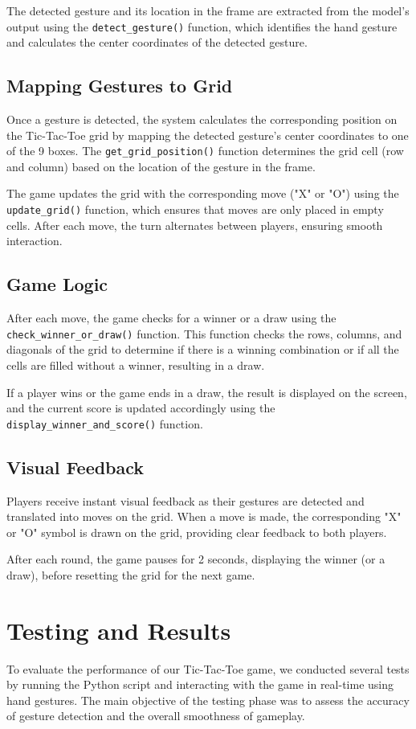 \documentclass[a4paper,12pt]{article}
\begin{document}
The detected gesture and its location in the frame are extracted from the model's output using the \texttt{detect\_gesture()} function, which identifies the hand gesture and calculates the center coordinates of the detected gesture.

\subsection{Mapping Gestures to Grid}
Once a gesture is detected, the system calculates the corresponding position on the Tic-Tac-Toe grid by mapping the detected gesture’s center coordinates to one of the 9 boxes. The \texttt{get\_grid\_position()} function determines the grid cell (row and column) based on the location of the gesture in the frame.

The game updates the grid with the corresponding move ("X" or "O") using the \texttt{update\_grid()} function, which ensures that moves are only placed in empty cells. After each move, the turn alternates between players, ensuring smooth interaction.

\subsection{Game Logic}
After each move, the game checks for a winner or a draw using the \texttt{check\_winner\_or\_draw()} function. This function checks the rows, columns, and diagonals of the grid to determine if there is a winning combination or if all the cells are filled without a winner, resulting in a draw.

If a player wins or the game ends in a draw, the result is displayed on the screen, and the current score is updated accordingly using the \texttt{display\_winner\_and\_score()} function.

\subsection{Visual Feedback}
Players receive instant visual feedback as their gestures are detected and translated into moves on the grid. When a move is made, the corresponding "X" or "O" symbol is drawn on the grid, providing clear feedback to both players.

After each round, the game pauses for 2 seconds, displaying the winner (or a draw), before resetting the grid for the next game.

\section{Testing and Results}
To evaluate the performance of our Tic-Tac-Toe game, we conducted several tests by running the Python script and interacting with the game in real-time using hand gestures. The main objective of the testing phase was to assess the accuracy of gesture detection and the overall smoothness of gameplay.
\end{document}
